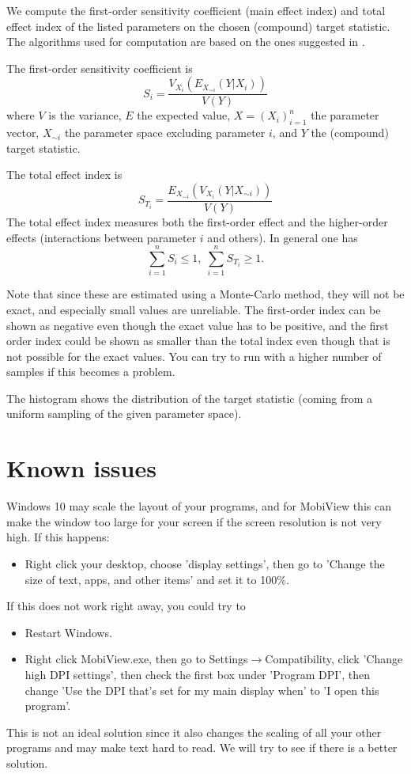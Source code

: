\documentclass[11pt]{article}
\theoremstyle{definition}
\begin{document}
We compute the first-order sensitivity coefficient (main effect index) and total effect index of the listed parameters on the chosen (compound) target statistic. The algorithms used for computation are based on the ones suggested in \cite{saltelli-et-al10}.

The first-order sensitivity coefficient is
\[
S_i = \frac{V_{X_i}(E_{X_{\sim i}}(Y|X_i))}{V(Y)}
\]
where $V$ is the variance, $E$ the expected value, $X=(X_i)_{i=1}^n$ the parameter vector, $X_{\sim i}$ the parameter space excluding parameter $i$, and $Y$ the (compound) target statistic.

The total effect index is
\[
S_{T_i} = \frac{E_{X_{\sim i}}(V_{X_i}(Y|X_{\sim i}))}{V(Y)}
\]
The total effect index measures both the first-order effect and the higher-order effects (interactions between parameter $i$ and others). In general one has
\[
\sum_{i=1}^n S_i \leq 1,\; \sum_{i=1}^n S_{T_i} \geq 1.
\]

Note that since these are estimated using a Monte-Carlo method, they will not be exact, and especially small values are unreliable. The first-order index can be shown as negative even though the exact value has to be positive, and the first order index could be shown as smaller than the total index even though that is not possible for the exact values. You can try to run with a higher number of samples if this becomes a problem.

The histogram shows the distribution of the target statistic (coming from a uniform sampling of the given parameter space).

\section{Known issues}

Windows 10 may scale the layout of your programs, and for MobiView this can make the window too large for your screen if the screen resolution is not very high. If this happens:
\begin{itemize}
\item Right click your desktop, choose 'display settings', then go to 'Change the size of text, apps, and other items' and set it to 100\%.
\end{itemize}
If this does not work right away, you could try to
\begin{itemize}
\item Restart Windows.
\item Right click MobiView.exe, then go to Settings$\rightarrow$Compatibility, click 'Change high DPI settings', then check the first box under 'Program DPI', then change 'Use the DPI that's set for my main display when' to 'I open this program'.
\end{itemize}
This is not an ideal solution since it also changes the scaling of all your other programs and may make text hard to read. We will try to see if there is a better solution.



\end{document}
